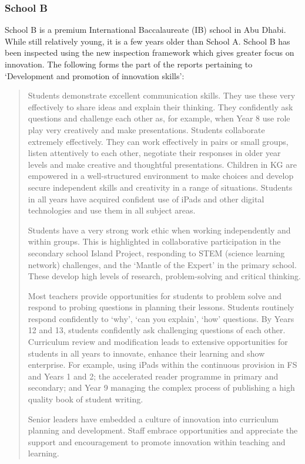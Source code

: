 \documentclass[11pt]{article}
\begin{document}
\subsubsection{School B}
School B is a premium International Baccalaureate (IB) school in Abu Dhabi. While still relatively young, it is a few years older than School A. School B has been inspected using the new inspection framework which gives greater focus on innovation. The following forms the part of the reports pertaining to `Development and promotion of innovation skills':
\begin{quote}
	Students demonstrate excellent communication skills. They use these very effectively to share ideas and explain their thinking. They confidently ask questions and challenge each other as, for example, when Year 8 use role play very creatively and make presentations. Students collaborate extremely effectively. They can work effectively in pairs or small groups, listen attentively to each other, negotiate their responses in older year levels and make creative and thoughtful presentations. Children in KG are empowered in a well-structured environment to make choices and develop secure independent skills and creativity in a range of situations. Students in all years have acquired confident use of iPads and other digital technologies and use them in all subject areas.
	
	Students have a very strong work ethic when working independently and within groups. This is highlighted in collaborative participation in the secondary school Island Project, responding to STEM (science learning network) challenges, and the `Mantle of the Expert' in the primary school. These develop high levels of research, problem-solving and critical thinking.
	
	Most teachers provide opportunities for students to problem solve and respond to probing questions in planning their lessons. Students routinely respond confidently to `why', `can you explain', `how' questions. By Years 12 and 13, students confidently ask challenging questions of each other.
	Curriculum review and modification leads to extensive opportunities for students in all years to innovate, enhance their learning and show enterprise. For example, using iPads within the continuous provision in FS and Years 1 and 2; the accelerated reader programme in primary and secondary; and Year 9 managing the complex process of publishing a high quality book of student writing.
	
	Senior leaders have embedded a culture of innovation into curriculum planning and development. Staff embrace opportunities and appreciate the support and encouragement to promote innovation within teaching and learning.
\end{quote}
\end{document}

